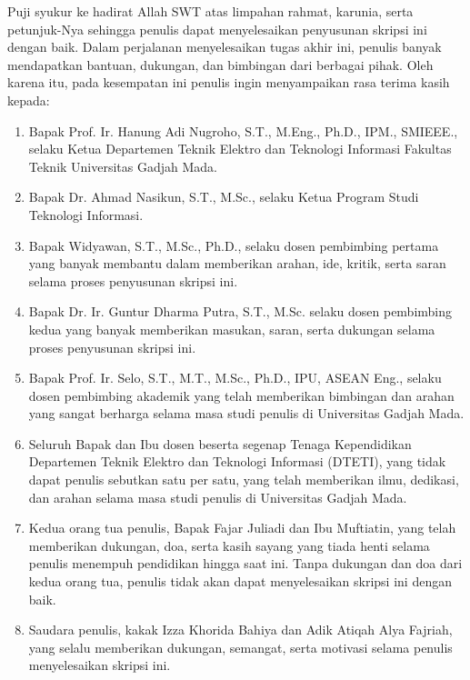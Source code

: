 Puji syukur ke hadirat Allah SWT atas limpahan rahmat, karunia, serta petunjuk-Nya sehingga penulis dapat menyelesaikan penyusunan skripsi ini dengan baik. Dalam perjalanan menyelesaikan tugas akhir ini, penulis banyak mendapatkan bantuan, dukungan, dan bimbingan dari berbagai pihak. Oleh karena itu, pada kesempatan ini penulis ingin menyampaikan rasa terima kasih kepada:

\begin{enumerate}
	\item Bapak Prof. Ir. Hanung Adi Nugroho, S.T., M.Eng., Ph.D., IPM., SMIEEE., selaku Ketua Departemen Teknik Elektro dan Teknologi Informasi Fakultas Teknik Universitas Gadjah Mada.
	
	\item Bapak Dr. Ahmad Nasikun, S.T., M.Sc., selaku Ketua Program Studi Teknologi Informasi.
	
	\item Bapak Widyawan, S.T., M.Sc., Ph.D., selaku dosen  pembimbing pertama yang banyak membantu dalam memberikan arahan, ide, kritik, serta saran selama proses penyusunan skripsi ini.
	
	\item Bapak Dr. Ir. Guntur Dharma Putra, S.T., M.Sc. selaku dosen pembimbing kedua yang banyak memberikan masukan, saran, serta dukungan selama proses penyusunan skripsi ini.
		
	\item Bapak Prof. Ir. Selo, S.T., M.T., M.Sc., Ph.D., IPU, ASEAN Eng., selaku dosen pembimbing akademik yang telah memberikan bimbingan dan arahan yang sangat berharga selama masa studi penulis di Universitas Gadjah Mada.
	
	\item Seluruh Bapak dan Ibu dosen beserta segenap Tenaga Kependidikan Departemen Teknik Elektro dan Teknologi Informasi (DTETI), yang tidak dapat penulis sebutkan satu per satu, yang telah memberikan ilmu, dedikasi, dan arahan selama masa studi penulis di Universitas Gadjah Mada.

	\item Kedua orang tua penulis, Bapak Fajar Juliadi dan Ibu Muftiatin, yang telah memberikan dukungan, doa, serta kasih sayang yang tiada henti selama penulis menempuh pendidikan hingga saat ini. Tanpa dukungan dan doa dari kedua orang tua, penulis tidak akan dapat menyelesaikan skripsi ini dengan baik.

	\item Saudara penulis, kakak Izza Khorida Bahiya dan Adik Atiqah Alya Fajriah, yang selalu memberikan dukungan, semangat, serta motivasi selama penulis menyelesaikan skripsi ini.


\end{enumerate}
